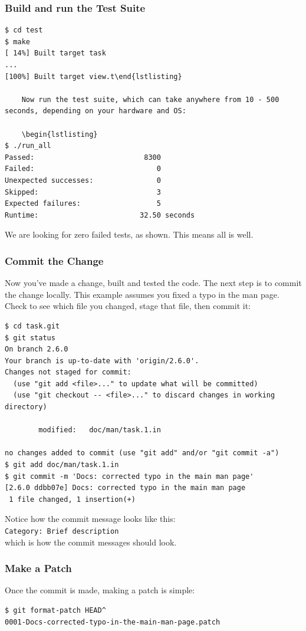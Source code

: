 \documentclass[t,handout]{beamer}
\begin{document}
\begin{frame}[fragile]\frametitle{Build and run the Test Suite}
    \vfill
    \begin{lstlisting}
$ cd test
$ make
[ 14%] Built target task
...
[100%] Built target view.t\end{lstlisting}

    Now run the test suite, which can take anywhere from 10 - 500 seconds, depending on your hardware and OS:

    \begin{lstlisting}
$ ./run_all
Passed:                          8300
Failed:                             0
Unexpected successes:               0
Skipped:                            3
Expected failures:                  5
Runtime:                        32.50 seconds\end{lstlisting}

    We are looking for zero failed tests, as shown.  This means all is well.
\end{frame}

\begin{frame}[fragile]\frametitle{Commit the Change}
    Now you've made a change, built and tested the code. The next step is to commit the change locally. This example assumes you fixed a typo in the man page. Check to see which file you changed, stage that file, then commit it:

    \begin{lstlisting}
$ cd task.git
$ git status
On branch 2.6.0
Your branch is up-to-date with 'origin/2.6.0'.
Changes not staged for commit:
  (use "git add <file>..." to update what will be committed)
  (use "git checkout -- <file>..." to discard changes in working directory)

        modified:   doc/man/task.1.in

no changes added to commit (use "git add" and/or "git commit -a")
$ git add doc/man/task.1.in
$ git commit -m 'Docs: corrected typo in the main man page'
[2.6.0 ddbb07e] Docs: corrected typo in the main man page
 1 file changed, 1 insertion(+)\end{lstlisting}

Notice how the commit message looks like this: \\
\verb=Category: Brief description= \\
which is how the commit messages should look.
\end{frame}

\begin{frame}[fragile]\frametitle{Make a Patch}
    \vfill
    Once the commit is made, making a patch is simple:

    \begin{lstlisting}
$ git format-patch HEAD^
0001-Docs-corrected-typo-in-the-main-man-page.patch\end{lstlisting}
\vfill

\end{frame}
\end{document}
